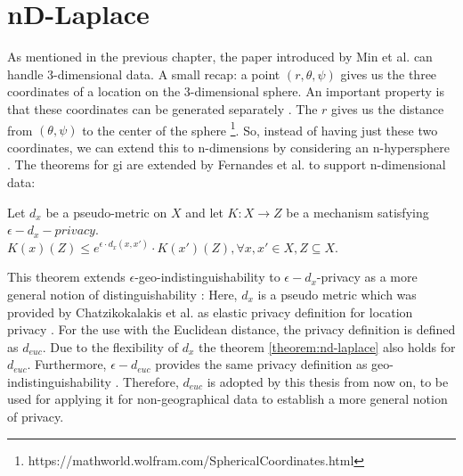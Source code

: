 \section{nD-Laplace}
As mentioned in the previous chapter, the paper introduced by Min et al. can handle 3-dimensional data.
A small recap: a point $(r, \theta, \psi)$ gives us the three coordinates of a location on the 3-dimensional sphere.
An important property is that these coordinates can be generated separately \citep{DBLP:journals/corr/abs-1212-1984, 9646489}.
The $r$ gives us the distance from $(\theta, \psi)$ to the center of the sphere \footnote{https://mathworld.wolfram.com/SphericalCoordinates.html}.
So, instead of having just these two coordinates, we can extend this to n-dimensions by considering an n-hypersphere \citep{fernandes_generalised_2019, 9646489}.
The theorems for \gls{gi} are extended by Fernandes et al. to support n-dimensional data:
\begin{theorem}
  Let $d_x$ be a pseudo-metric on $X$ and let $K: X \rightarrow Z$ be a mechanism satisfying $\epsilon-d_x-privacy$. \\
  $K(x)(Z) \leq e^{\epsilon \cdot d_x (x, x')} \cdot K(x')(Z), \forall x, x' \in X, Z \subseteq X$.
  \label{theorem:nd-laplace}
\end{theorem}
This theorem extends $\epsilon$-geo-indistinguishability to $\epsilon-d_x$-privacy as a more general notion of distinguishability \citep{fernandes_generalised_2019}:
Here, $d_x$ is a pseudo metric which was provided by Chatzikokalakis et al. as elastic privacy definition for location privacy \citep{chatzikokolakis_constructing_2015}. For the use with the Euclidean distance, the privacy definition is defined as $d_{euc}$. Due to the flexibility of $d_x$ the theorem \ref{theorem:nd-laplace} also holds for $d_{euc}$.  Furthermore, $\epsilon-d_{euc}$ provides the same privacy definition as geo-indistinguishability \citep{chatzikokolakis_constructing_2015}.
Therefore, $d_{euc}$ is adopted by this thesis from now on, to be used for applying it for non-geographical data to establish a more general notion of privacy. \newline

